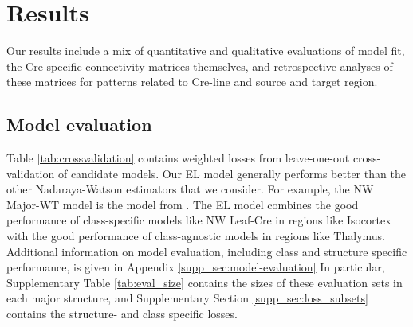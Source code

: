 \section{Results}
\label{sec:results}

Our results include a mix of quantitative and qualitative evaluations of model fit, the Cre-specific connectivity matrices themselves, and retrospective analyses of these matrices for  patterns related to Cre-line and source and target region.

\subsection{Model evaluation}
\label{sec:model_eval}

Table \ref{tab:crossvalidation} contains weighted losses from leave-one-out cross-validation of candidate models.
Our EL model generally performs better than the other Nadaraya-Watson estimators that we consider.
For example, the NW Major-WT model is the model from  \citet{Knox2019-ot}.
The EL model combines the good performance of class-specific models like NW Leaf-Cre in regions like Isocortex with the good performance of class-agnostic models in regions like Thalymus.
Additional information on model evaluation, including class and structure specific performance, is given in Appendix \ref{supp_sec:model-evaluation}
In particular, Supplementary Table \ref{tab:eval_size} contains the sizes of these evaluation sets in each major structure, and Supplementary Section \ref{supp_sec:loss_subsets} contains the structure- and class specific losses.

